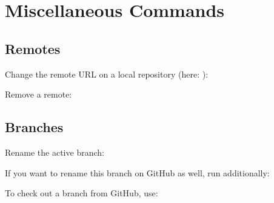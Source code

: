 \section{Miscellaneous Commands}\label{git-misc-commands}


\subsection{Remotes}\label{git-remote}

\begin{flushleft}
	Change the remote URL on a local repository (here: ):
\end{flushleft}

\begin{flushleft}
\end{flushleft}

\begin{flushleft}
	Remove a remote:
\end{flushleft}

\begin{flushleft}
\end{flushleft}


\subsection{Branches}\label{git-branch}

\begin{flushleft}
	Rename the active branch:
\end{flushleft}

\begin{flushleft}
\end{flushleft}

\begin{flushleft}
	If you want to rename this branch on GitHub as well, run additionally:
\end{flushleft}

\begin{flushleft}
\end{flushleft}

\begin{flushleft}
	To check out a branch from GitHub, use:
\end{flushleft}

